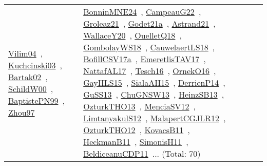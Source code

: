{\begin{longtable}{lp{3cm}>{\raggedright\arraybackslash}p{6cm}>{\raggedright\arraybackslash}p{6cm}>{\raggedright\arraybackslash}p{8cm}}
\href{../works/Vilim04.pdf}{Vilim04}~\cite{Vilim04}, \href{../works/Kuchcinski03.pdf}{Kuchcinski03}~\cite{Kuchcinski03}, \href{../works/Bartak02.pdf}{Bartak02}~\cite{Bartak02}, \href{../works/SchildW00.pdf}{SchildW00}~\cite{SchildW00}, \href{../works/BaptistePN99.pdf}{BaptistePN99}~\cite{BaptistePN99}, \href{../works/Zhou97.pdf}{Zhou97}~\cite{Zhou97} & \href{../works/BonninMNE24.pdf}{BonninMNE24}~\cite{BonninMNE24}, \href{../works/CampeauG22.pdf}{CampeauG22}~\cite{CampeauG22}, \href{../works/Groleaz21.pdf}{Groleaz21}~\cite{Groleaz21}, \href{../works/Godet21a.pdf}{Godet21a}~\cite{Godet21a}, \href{../works/Astrand21.pdf}{Astrand21}~\cite{Astrand21}, \href{../works/WallaceY20.pdf}{WallaceY20}~\cite{WallaceY20}, \href{../works/OuelletQ18.pdf}{OuelletQ18}~\cite{OuelletQ18}, \href{../works/GombolayWS18.pdf}{GombolayWS18}~\cite{GombolayWS18}, \href{../works/CauwelaertLS18.pdf}{CauwelaertLS18}~\cite{CauwelaertLS18}, \href{../works/BofillCSV17a.pdf}{BofillCSV17a}~\cite{BofillCSV17a}, \href{../works/EmeretlisTAV17.pdf}{EmeretlisTAV17}~\cite{EmeretlisTAV17}, \href{../works/NattafAL17.pdf}{NattafAL17}~\cite{NattafAL17}, \href{../works/Tesch16.pdf}{Tesch16}~\cite{Tesch16}, \href{../works/OrnekO16.pdf}{OrnekO16}~\cite{OrnekO16}, \href{../works/GayHLS15.pdf}{GayHLS15}~\cite{GayHLS15}, \href{../works/SialaAH15.pdf}{SialaAH15}~\cite{SialaAH15}, \href{../works/DerrienP14.pdf}{DerrienP14}~\cite{DerrienP14}, \href{../works/GuSS13.pdf}{GuSS13}~\cite{GuSS13}, \href{../works/ChuGNSW13.pdf}{ChuGNSW13}~\cite{ChuGNSW13}, \href{../works/HeinzSB13.pdf}{HeinzSB13}~\cite{HeinzSB13}, \href{../works/OzturkTHO13.pdf}{OzturkTHO13}~\cite{OzturkTHO13}, \href{../works/MenciaSV12.pdf}{MenciaSV12}~\cite{MenciaSV12}, \href{../works/LimtanyakulS12.pdf}{LimtanyakulS12}~\cite{LimtanyakulS12}, \href{../works/MalapertCGJLR12.pdf}{MalapertCGJLR12}~\cite{MalapertCGJLR12}, \href{../works/OzturkTHO12.pdf}{OzturkTHO12}~\cite{OzturkTHO12}, \href{../works/KovacsB11.pdf}{KovacsB11}~\cite{KovacsB11}, \href{../works/HeckmanB11.pdf}{HeckmanB11}~\cite{HeckmanB11}, \href{../works/SimonisH11.pdf}{SimonisH11}~\cite{SimonisH11}, \href{../works/BeldiceanuCDP11.pdf}{BeldiceanuCDP11}~\cite{BeldiceanuCDP11}... (Total: 70)\\

\end{longtable}}
